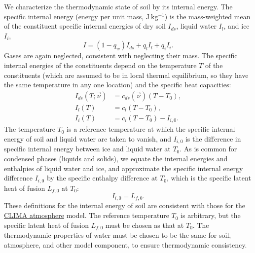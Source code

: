 \documentclass[twoside,10pt]{report}
\begin{document}
We characterize the thermodynamic state of soil by its internal energy. The specific internal energy (energy per unit mass, $\mathrm{J~kg^{-1}}$) is the mass-weighted mean of the constituent specific internal energies of dry soil $I_{ds}$, liquid water $I_l$, and ice $I_i$,
\begin{equation}\label{e:energy_soil}
    I = (1-q_w) I_{ds} + q_l I_l + q_i I_i.
\end{equation}
Gases are again neglected, consistent with neglecting their mass. The specific internal energies of the constituents depend on the temperature $T$ of the constituents (which are assumed to be in local thermal equilibrium, so they have the same temperature in any one location) and the specific heat capacities:
\begin{subequations}\label{e:soil_internal_energies}
\begin{align}
I_{ds}(T; \vec{\nu}) & = c_{ds}(\vec{\nu}) (T - T_0),  \\
I_l(T) & = c_{l} (T - T_0), \\
I_i(T) & = c_{i} (T - T_0) - I_{i,0}.
\end{align}
\end{subequations}
The temperature $T_0$ is a reference temperature at which the specific internal energy of soil and liquid water are taken to vanish, and $I_{i,0}$ is the difference in specific internal energy between ice and liquid water at $T_0$. As is common for condensed phases (liquids and solids), we equate the internal energies and enthalpies of liquid water and ice, and approximate the specific internal energy difference $I_{i,0}$ by the specific enthalpy difference at $T_0$, which is the specific latent heat of fusion $L_{f,0}$ at $T_0$: 
\begin{equation}
    I_{i,0} = L_{f,0}.
\end{equation} 
These definitions for the internal energy of soil are consistent with those for the \href{https://github.com/climate-machine/Design-Docs/blob/master/CLIMA-atmos/}{CLIMA atmosphere} model. The reference temperature $T_0$ is arbitrary, but the specific latent heat of fusion $L_{f,0}$ must be chosen as that at $T_0$. The thermodynamic properties of water must be chosen to be the same for soil, atmosphere, and other model component, to ensure thermodynamic consistency. 
\end{document}

